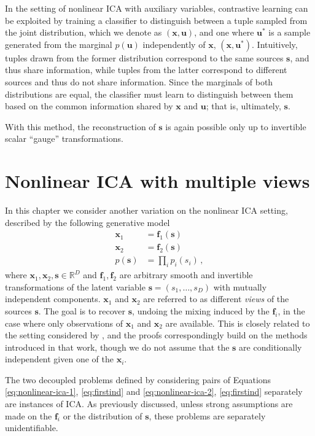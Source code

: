 In the setting of nonlinear ICA with auxiliary variables, contrastive learning can be exploited by training a classifier to distinguish between a tuple sampled from the joint distribution, which we denote as $(\bm{x}, \bm{u})$, and one where $\bm{u}^*$ is a sample generated from the marginal $p(\bm{u})$ independently of $\bm{x}$, $(\bm{x}, \bm{u}^*)$.
Intuitively, tuples drawn from the former distribution correspond to the same sources $\bm{s}$, and thus share information, while tuples from the latter correspond to different sources and thus do not share information.
Since the marginals of both distributions are equal, the classifier must learn to distinguish between them based on the common information shared by $\bm{x}$ and $\bm{u}$; that is, ultimately, $\bm{s}$.

With this method, the reconstruction of $\bm{s}$ is again possible only up to invertible scalar ``gauge'' transformations. 

\section{Nonlinear ICA with multiple views}

In this chapter we consider another variation on the nonlinear ICA setting, described by the following generative model    
\begin{align}
\bm{x}_1 &= \bm{f}_1(\bm{s}) \label{eq:nonlinear-ica-1}\\
\bm{x}_2 &= \bm{f}_2(\bm{s}) \label{eq:nonlinear-ica-2}\\
p(\bm{s}) &= \prod_{i} p_i(s_i) \label{eq:firstind}\,,
\end{align}
where $\bm{x}_1, \bm{x}_2, \bm{s} \in \mathbb{R}^D$ and $\bm{f}_1, \bm{f}_2$ are arbitrary smooth and invertible transformations of the latent variable $\bm{s} = (s_1, \ldots, s_D)$ with mutually independent components.
$\bm{x}_1$ and $\bm{x}_2$ are referred to as different \emph{views} of the sources $\bm{s}$.
The goal is to recover $\bm{s}$, undoing the mixing induced by the $\bm{f}_i$, in the case where only observations of $\bm{x}_1$ and $\bm{x}_2$ are available.
This is closely related to the setting considered by \cite{hyvarinen19a}, and the proofs correspondingly build on the methods introduced in that work, though we do not assume that the $\bm{s}$ are conditionally independent given one of the $\bm{x}_i$.

The two decoupled problems defined by considering pairs of Equations \ref{eq:nonlinear-ica-1}, \ref{eq:firstind} and \ref{eq:nonlinear-ica-2}, \ref{eq:firstind} separately are instances of ICA.
As previously discussed, unless strong assumptions are made on the $\bm{f}_i$ or the distribution of $\bm{s}$, these problems are separately unidentifiable. 

